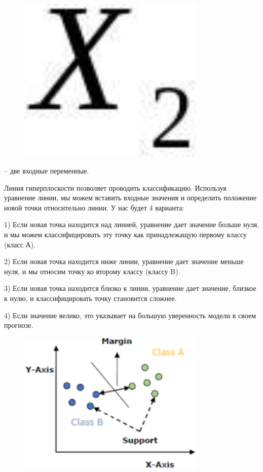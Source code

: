 \begin{figure}[H]
	\centering
	\includegraphics[width=0.8\textwidth]{assets/109}
	\caption*{}
\end{figure} -- две входные переменные.

Линия гиперплоскости позволяет проводить классификацию. Используя
уравнение линии, мы можем вставить входные значения и определить
положение новой точки относительно линии. У нас будет 4 варианта:

1) Если новая точка находится над линией, уравнение дает значение больше
нуля, и мы можем классифицировать эту точку как принадлежащую первому
классу (класс А).

2) Если новая точка находится ниже линии, уравнение дает значение меньше
нуля, и мы относим точку ко второму классу (классу B).

3) Если новая точка находится близко к линии, уравнение дает значение,
близкое к нулю, и классифицировать точку становится сложнее.

4) Если значение велико, это указывает на большую уверенность модели в
своем прогнозе.

\begin{figure}[H]
	\centering
	\includegraphics[width=0.8\textwidth]{assets/110}
	\caption*{}
\end{figure}

